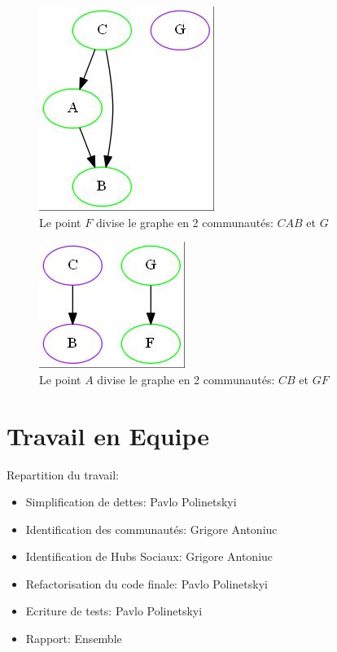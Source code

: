 \documentclass[12pt, oneside]{article}
\begin{document}
\begin{figure}[!h]
    \centering
    \includegraphics[scale=0.7,trim=3 3 3 3,clip]{APResult3_1}
    \caption{Le point $F$ divise le graphe en 2 communautés: {$CAB$} et {$G$} }
\end{figure}

\begin{figure}[!h]
    \centering
    \includegraphics[scale=0.7,trim=3 3 3 3,clip]{APResult2_2}
    \caption{Le point $A$ divise le graphe en 2 communautés: {$CB$} et {$GF$} }
\end{figure}
\newpage
\FloatBarrier
\section{Travail en Equipe}
Repartition du travail:
\begin{itemize}
\item Simplification de dettes: Pavlo Polinetskyi
\item Identification des communautés: Grigore Antoniuc
\item Identification de Hubs Sociaux: Grigore Antoniuc
\item Refactorisation du code finale: Pavlo Polinetskyi
\item Ecriture de tests: Pavlo Polinetskyi
\item Rapport: Ensemble
\end{itemize}
\bigskip
\end{document}
